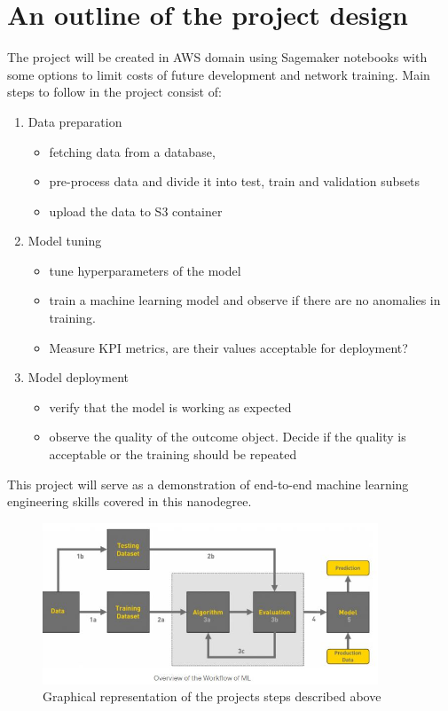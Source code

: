 \documentclass{article}
\begin{document}
\section{An outline of the project design}
The project will be created in AWS domain using Sagemaker notebooks with some options to limit costs of future development and network training. 
Main steps to follow in the project consist of:
\begin{enumerate}
	\item Data preparation
	\begin{itemize}
		\item fetching data from a database, 
		\item pre-process data and divide it into test, train and validation subsets
		\item upload the data to S3 container
	\end{itemize}	
	\item Model tuning
	\begin{itemize}
		\item tune hyperparameters of the model
		\item train a machine learning model and observe if there are no anomalies in training.
		\item Measure KPI metrics, are their values acceptable for deployment?
	\end{itemize}	
	\item Model deployment
	\begin{itemize}
		\item verify that the model is working as expected
		\item observe the quality of the outcome object. Decide if the quality is acceptable or the training should be repeated
	\end{itemize}
\end{enumerate}

This project will serve as a demonstration of end-to-end machine learning engineering skills covered in this nanodegree.

\begin{figure}[ht]
	\centering
	\includegraphics[width=100mm]{schematic.jpg}
	\caption{Graphical representation of the projects steps described above}
\end{figure}
\end{document}
